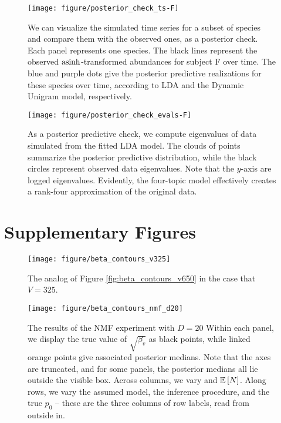 \documentclass[oupdraft]{bio}
\begin{document}
\begin{figure}[!p]
  \centering
  \texttt{[image: figure/posterior\_check\_ts-F]}
  \caption{We can visualize the simulated time series for a subset of species
    and compare them with the observed ones, as a posterior check. Each panel
    represents one species. The black lines represent the observed
    $\mathop\mathrm{asinh}$-transformed abundances for subject F over time. The blue and purple
    dots give the posterior predictive realizations for these species over time,
    according to LDA and the Dynamic Unigram model, respectively.
    \label{fig:antibiotics_posterior_ts}}
\end{figure}

\begin{figure}[!p]
  \centering
  \texttt{[image: figure/posterior\_check\_evals-F]}
  \caption{As a posterior predictive check, we compute eigenvalues of data
    simulated from the fitted LDA model. The clouds of points summarize the
    posterior predictive distribution, while the black circles represent
    observed data eigenvalues. Note that the $y$-axis are logged eigenvalues.
    Evidently, the four-topic model effectively creates a rank-four
    approximation of the original data. \label{fig:antibiotics_posterior_evals}}
\end{figure}

\section{Supplementary Figures}

\begin{figure}[!p]
  \centering
  \texttt{[image: figure/beta\_contours\_v325]}
  \caption{The analog of Figure \ref{fig:beta_contours_v650} in the case that $V
    = 325$. \label{fig:beta_contours_v325}}
\end{figure}

\begin{figure}[!p]
  \centering
  \texttt{[image: figure/beta\_contours\_nmf\_d20]}
  \caption{The results of the NMF experiment with $D = 20$ Within each panel, we
    display the true value of $\sqrt{\beta_{v}}$ as black points, while linked
    orange points give associated posterior medians. Note that the axes are
    truncated, and for some panels, the posterior medians all lie outside the
    visible box. Across columns, we vary and $\mathbb{E}\left[{N}\right]$. Along rows, we vary the
    assumed model, the inference procedure, and the true $p_{0}$ -- these are
    the three columns of row labels, read from outside
    in.\label{fig:beta_contours_nmf_d20}}
\end{figure}
\end{document}
